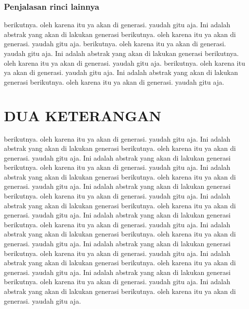 \subsubsection{Penjalasan rinci lainnya}
berikutnya. oleh karena itu ya akan di generasi. yaudah gitu aja. Ini adalah abstrak yang akan di lakukan generasi berikutnya. oleh karena itu ya akan di generasi. yaudah gitu aja. berikutnya. oleh karena itu ya akan di generasi. yaudah gitu aja. Ini adalah abstrak yang akan di lakukan generasi berikutnya. oleh karena itu ya akan di generasi. yaudah gitu aja. berikutnya. oleh karena itu ya akan di generasi. yaudah gitu aja. Ini adalah abstrak yang akan di lakukan generasi berikutnya. oleh karena itu ya akan di generasi. yaudah gitu aja.

\section{DUA KETERANGAN}
berikutnya. oleh karena itu ya akan di generasi. yaudah gitu aja. Ini adalah abstrak yang akan di lakukan generasi berikutnya. oleh karena itu ya akan di generasi. yaudah gitu aja. Ini adalah abstrak yang akan di lakukan generasi berikutnya. oleh karena itu ya akan di generasi. yaudah gitu aja. Ini adalah abstrak yang akan di lakukan generasi berikutnya. oleh karena itu ya akan di generasi. yaudah gitu aja. Ini adalah abstrak yang akan di lakukan generasi berikutnya. oleh karena itu ya akan di generasi. yaudah gitu aja. Ini adalah abstrak yang akan di lakukan generasi berikutnya. oleh karena itu ya akan di generasi. yaudah gitu aja. Ini adalah abstrak yang akan di lakukan generasi berikutnya. oleh karena itu ya akan di generasi. yaudah gitu aja. Ini adalah abstrak yang akan di lakukan generasi berikutnya. oleh karena itu ya akan di generasi. yaudah gitu aja. Ini adalah abstrak yang akan di lakukan generasi berikutnya. oleh karena itu ya akan di generasi. yaudah gitu aja. Ini adalah abstrak yang akan di lakukan generasi berikutnya. oleh karena itu ya akan di generasi. yaudah gitu aja. Ini adalah abstrak yang akan di lakukan generasi berikutnya. oleh karena itu ya akan di generasi. yaudah gitu aja. Ini adalah abstrak yang akan di lakukan generasi berikutnya. oleh karena itu ya akan di generasi. yaudah gitu aja.

